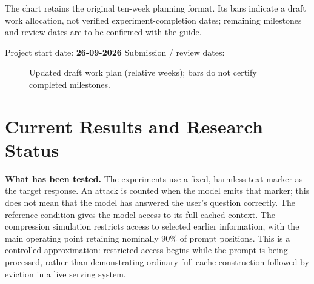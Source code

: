 \documentclass[11pt,a4paper]{article}
\newcommand{\blank}[1]{\underline{\hspace{#1}}}
\begin{document}
The chart retains the original ten-week planning format. Its bars indicate a draft work allocation, not verified experiment-completion dates; remaining milestones and review dates are to be confirmed with the guide.

Project start date: \textbf{26-09-2026} \qquad Submission / review dates: \blank{5cm}

\begin{figure}[h]
\centering
{}
\caption{Updated draft work plan (relative weeks); bars do not certify completed milestones.}
\end{figure}

\section{Current Results and Research Status}
\label{sec:current-results}

\textbf{What has been tested.} The experiments use a fixed, harmless text marker as the target response. An attack is counted when the model emits that marker; this does not mean that the model has answered the user's question correctly. The reference condition gives the model access to its full cached context. The compression simulation restricts access to selected earlier information, with the main operating point retaining nominally 90\% of prompt positions. This is a controlled approximation: restricted access begins while the prompt is being processed, rather than demonstrating ordinary full-cache construction followed by eviction in a live serving system.
\end{document}
